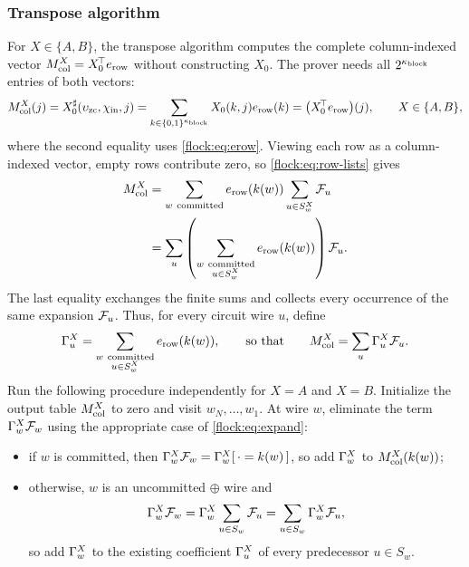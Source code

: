 \subsubsection{Transpose algorithm}\label{flock:backward}

For $X\in\{A,B\}$, the transpose algorithm computes the complete column-indexed vector $M_{\mathrm{col}}^{X}=X_0^{\!\top}e_{\mathrm{row}}$ without constructing $X_0$. The prover needs all $2^{\kappa_{\mathrm{block}}}$ entries of both vectors:
\begin{equation}\label{flock:eq:marginal}
M_{\mathrm{col}}^{X}(j)=X^{\sharp}_0(\upsilon_{\mathrm{zc}},\chi_{\mathrm{in}},j)=\sum_{k\in\{0,1\}^{\kappa_{\mathrm{block}}}}X_0(k,j)e_{\mathrm{row}}(k)=\bigl(X_0^{\!\top}e_{\mathrm{row}}\bigr)(j),\qquad X\in\{A,B\},
\end{equation}
where the second equality uses \eqref{flock:eq:erow}. Viewing each row as a column-indexed vector, empty rows contribute zero, so \eqref{flock:eq:row-lists} gives
\begin{align*}
M_{\mathrm{col}}^{X}
&=\sum_{w\ \mathrm{committed}}e_{\mathrm{row}}(k(w))\sum_{u\in S^X_w}\mathcal{F}_{u}\\
&=\sum_u\left(\sum_{\substack{w\ \mathrm{committed}\\u\in S^X_w}}e_{\mathrm{row}}(k(w))\right)\mathcal{F}_{u}.
\end{align*}
The last equality exchanges the finite sums and collects every occurrence of the same expansion $\mathcal{F}_{u}$. Thus, for every circuit wire $u$, define
\begin{equation*}
\chg{u}^{X}=\sum_{\substack{w\ \mathrm{committed}\\u\in S^X_w}}\erow(\posof{w}),
\qquad \text{so that}\qquad
\colmar^{X}=\sum_u\chg{u}^{X}\lform{u}.
\end{equation*}
Run the following procedure independently for $X=A$ and $X=B$. Initialize the output table $M_{\mathrm{col}}^{X}$ to zero and visit $w_N,\ldots,w_1$. At wire $w$, eliminate the term $\Gamma_{w}^{X}\mathcal{F}_{w}$ using the appropriate case of \eqref{flock:eq:expand}:
\begin{itemize}
\item if $w$ is committed, then $\Gamma_{w}^{X}\mathcal{F}_{w}=\Gamma_{w}^{X}[\,\cdot=k(w)\,]$, so add $\Gamma_{w}^{X}$ to $M_{\mathrm{col}}^{X}(k(w))$;
\item otherwise, $w$ is an uncommitted $\oplus$ wire and
\[
\Gamma_{w}^{X}\mathcal{F}_{w}=\Gamma_{w}^{X}\sum_{u\in S_w}\mathcal{F}_{u}=\sum_{u\in S_w}\Gamma_{w}^{X}\mathcal{F}_{u},
\]
so add $\Gamma_{w}^{X}$ to the existing coefficient $\Gamma_{u}^{X}$ of every predecessor $u\in S_w$.
\end{itemize}


